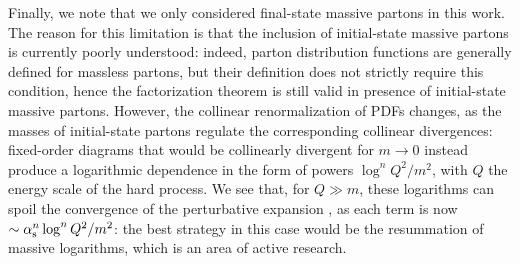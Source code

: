 Finally, we note that we only considered final-state massive partons in this work. The reason for this limitation is that the inclusion of initial-state massive partons is currently poorly understood: indeed, parton distribution functions are generally defined for massless partons, but their definition does not strictly require this condition, hence the factorization theorem  is still valid in presence of initial-state massive partons. However, the collinear renormalization of PDFs changes, as the masses of initial-state partons regulate the corresponding collinear divergences: fixed-order diagrams that would be collinearly divergent for $ m \rightarrow 0 $ instead produce a logarithmic dependence in the form of powers $ \log^n Q^2 / m^2 $, with $ Q $ the energy scale of the hard process. We see that, for $ Q \gg m $, these logarithms can spoil the convergence of the perturbative expansion , as each term is now $ \sim \alpha_\text{s}^n \log^n Q^2 / m^2 $: the best strategy in this case would be the resummation of massive logarithms, which is an area of active research.
